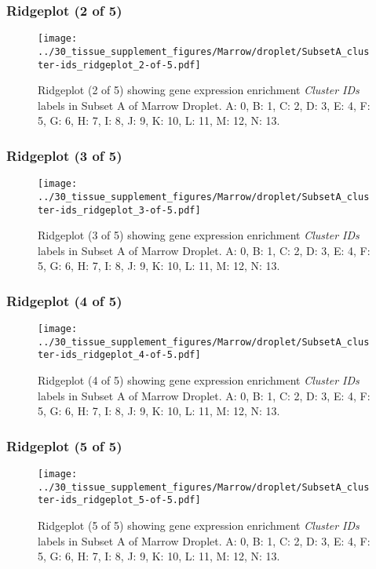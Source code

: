 \clearpage

\subsubsection{Ridgeplot (2 of 5)}
\begin{figure}[h]
\centering
\texttt{[image: ../30\_tissue\_supplement\_figures/Marrow/droplet/SubsetA\_cluster-ids\_ridgeplot\_2-of-5.pdf]}

\caption{ Ridgeplot (2 of 5)  showing gene expression enrichment \emph{Cluster IDs} labels in Subset A of Marrow Droplet. A: 0, B: 1, C: 2, D: 3, E: 4, F: 5, G: 6, H: 7, I: 8, J: 9, K: 10, L: 11, M: 12, N: 13.}
\end{figure}


\clearpage

\subsubsection{Ridgeplot (3 of 5)}
\begin{figure}[h]
\centering
\texttt{[image: ../30\_tissue\_supplement\_figures/Marrow/droplet/SubsetA\_cluster-ids\_ridgeplot\_3-of-5.pdf]}

\caption{ Ridgeplot (3 of 5)  showing gene expression enrichment \emph{Cluster IDs} labels in Subset A of Marrow Droplet. A: 0, B: 1, C: 2, D: 3, E: 4, F: 5, G: 6, H: 7, I: 8, J: 9, K: 10, L: 11, M: 12, N: 13.}
\end{figure}


\clearpage

\subsubsection{Ridgeplot (4 of 5)}
\begin{figure}[h]
\centering
\texttt{[image: ../30\_tissue\_supplement\_figures/Marrow/droplet/SubsetA\_cluster-ids\_ridgeplot\_4-of-5.pdf]}

\caption{ Ridgeplot (4 of 5)  showing gene expression enrichment \emph{Cluster IDs} labels in Subset A of Marrow Droplet. A: 0, B: 1, C: 2, D: 3, E: 4, F: 5, G: 6, H: 7, I: 8, J: 9, K: 10, L: 11, M: 12, N: 13.}
\end{figure}


\clearpage

\subsubsection{Ridgeplot (5 of 5)}
\begin{figure}[h]
\centering
\texttt{[image: ../30\_tissue\_supplement\_figures/Marrow/droplet/SubsetA\_cluster-ids\_ridgeplot\_5-of-5.pdf]}

\caption{ Ridgeplot (5 of 5)  showing gene expression enrichment \emph{Cluster IDs} labels in Subset A of Marrow Droplet. A: 0, B: 1, C: 2, D: 3, E: 4, F: 5, G: 6, H: 7, I: 8, J: 9, K: 10, L: 11, M: 12, N: 13.}
\end{figure}


